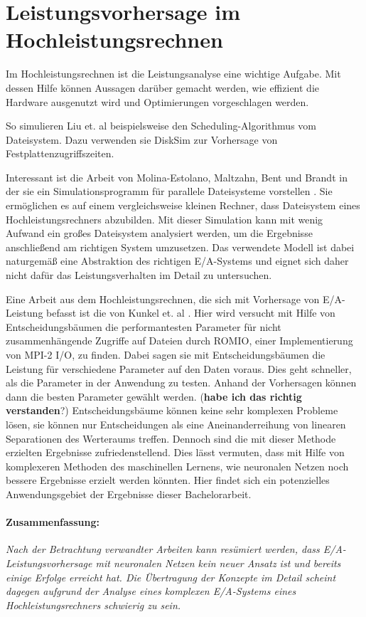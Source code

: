 \documentclass[
	12pt,
	a4paper,
	BCOR10mm,
	DIV14,
	listof=totoc,
	bibliography=totoc,
	headsepline
]{scrreprt}
\begin{document}
\section{Leistungsvorhersage im Hochleistungsrechnen}

Im Hochleistungsrechnen ist die Leistungsanalyse eine wichtige Aufgabe. Mit dessen Hilfe können Aussagen darüber gemacht werden, wie effizient die Hardware ausgenutzt wird und Optimierungen vorgeschlagen werden. 

So simulieren Liu et. al \cite{liu2011towards} beispielsweise den Scheduling-Algorithmus vom Dateisystem. Dazu verwenden sie DiskSim \cite{Bucy08thedisksim} zur Vorhersage von Festplattenzugriffszeiten.

Interessant ist die Arbeit von Molina-Estolano, Maltzahn, Bent und Brandt in der sie ein Simulationsprogramm für parallele Dateisysteme vorstellen \cite{molina2009building}. Sie ermöglichen es auf einem vergleichsweise kleinen Rechner, dass Dateisystem eines Hochleistungsrechners abzubilden. Mit dieser Simulation kann mit wenig Aufwand ein großes Dateisystem analysiert werden, um die Ergebnisse anschließend am richtigen System umzusetzen. Das verwendete Modell ist dabei naturgemäß eine Abstraktion des richtigen E/A-Systems und eignet sich daher nicht dafür das Leistungsverhalten im Detail zu untersuchen.

Eine Arbeit aus dem Hochleistungsrechnen, die sich mit Vorhersage von E/A-Leistung befasst ist die von Kunkel et. al \cite{UMLTPTPONI15}. Hier wird versucht mit Hilfe von Entscheidungsbäumen die performantesten Parameter für nicht zusammenhängende Zugriffe auf Dateien durch ROMIO, einer Implementierung von MPI-2 I/O, zu finden.
Dabei sagen sie mit Entscheidungsbäumen die Leistung für verschiedene Parameter auf den Daten voraus. Dies geht schneller, als die Parameter in der Anwendung zu testen. Anhand der Vorhersagen können dann die besten Parameter gewählt werden. (\textbf{habe ich das richtig verstanden}?) 
Entscheidungsbäume können keine sehr komplexen Probleme lösen, sie können nur Entscheidungen als eine Aneinanderreihung von linearen Separationen des Werteraums treffen. Dennoch sind die mit dieser Methode erzielten Ergebnisse zufriedenstellend. Dies lässt vermuten, dass mit Hilfe von komplexeren Methoden des maschinellen Lernens, wie neuronalen Netzen noch bessere Ergebnisse erzielt werden könnten.
Hier findet sich ein potenzielles Anwendungsgebiet der Ergebnisse dieser Bachelorarbeit.

\paragraph{Zusammenfassung:}
\textit{
	Nach der Betrachtung verwandter Arbeiten kann resümiert werden, dass E/A-Leistungsvorhersage mit neuronalen Netzen kein neuer Ansatz ist und bereits einige Erfolge erreicht hat. Die Übertragung der Konzepte im Detail scheint dagegen aufgrund der Analyse eines komplexen E/A-Systems eines Hochleistungsrechners schwierig zu sein.
}
\end{document}
